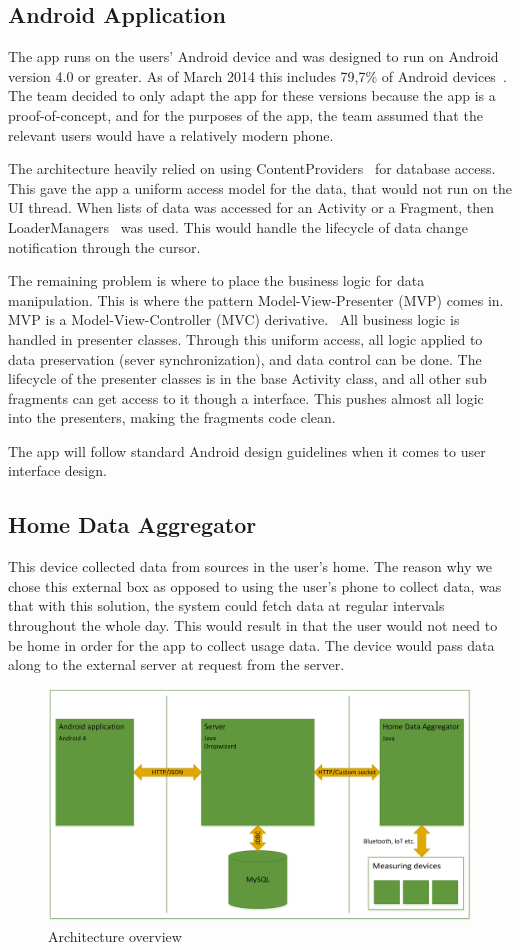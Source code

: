 \subsection{Android Application}
The app runs on the users' Android device and was designed to run on Android version 4.0 or greater. As of March 2014 this includes 79,7\% of Android devices~\cite{AndroidDeviceFragmentation}. The team decided to only adapt the app for these versions because the app is a proof-of-concept, and for the purposes of the app, the team assumed that the relevant users would have a relatively modern phone. 

The architecture heavily relied on using ContentProviders~\cite{contentproviders} for database access. This gave the app a uniform access model for the data, that would not run on the UI thread. When lists of data was accessed for an Activity or a Fragment, then LoaderManagers~\cite{loadermanager} was used. This would handle the lifecycle of data change notification through the cursor. 

The remaining problem is where to place the business logic for data manipulation. This is where the pattern Model-View-Presenter (MVP) comes in. MVP is a Model-View-Controller (MVC) derivative.~\cite{mvc} All business logic is handled in presenter classes. Through this uniform access, all logic applied to data preservation (sever synchronization), and data control can be done. The lifecycle of the presenter classes is in the base Activity class, and all other sub fragments can get access to it though a interface. This pushes almost all logic into the presenters, making the fragments code clean.

The app will follow standard Android design guidelines when it comes to user interface design.

\subsection{Home Data Aggregator}
This device collected data from sources in the user's home. The reason why we chose this external box as opposed to using the user's phone to collect data, was that with this solution, the system could fetch data at regular intervals throughout the whole day. This would result in that the user would not need to be home in order for the app to collect 
usage data. The device would pass data along to the external server at request from the server.

\begin{figure}[H]
\includegraphics[width=\textwidth]{ch/architecture/fig/architecture.png}
\caption{Architecture overview}
\end{figure}
